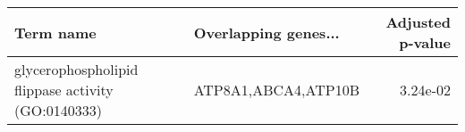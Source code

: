 \begin{tabular}{llr}
\toprule
                                         Term name & Overlapping genes... &  Adjusted p-value \\
\midrule
glycerophospholipid flippase activity (GO:0140333) &  ATP8A1,ABCA4,ATP10B &          3.24e-02 \\
\bottomrule
\end{tabular}
